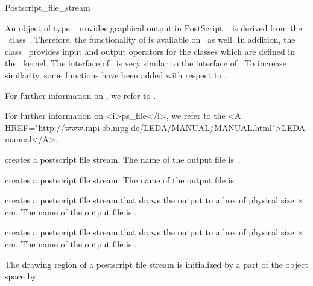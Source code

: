 
\begin{ccRefClass} {Postscript_file_stream}



\ccDefinition 
An object of type \ccRefName\ provides graphical output in PostScript.
\ccRefName\ is derived from the \leda\ class .
Therefore, the functionality of  is available on \ccRefName\ as well.
In addition, the class \ccRefName\ provides input and output 
operators for the classes which are defined in the \cgal\ kernel.
The interface of \ccRefName\ is very similar to the interface of . 
To increase similarity, some functions have been added with respect to .
\begin{ccTexOnly}
For further information on , we refer to \cite{cgal:mnsu-lum}.
\end{ccTexOnly}
\begin{ccHtmlOnly}
For further information on <i>ps_file</i>, we refer to the 
<A HREF="http://www.mpi-sb.mpg.de/LEDA/MANUAL/MANUAL.html">LEDA manual</A>.
\end{ccHtmlOnly}


\ccCreation

{creates a postscript file stream. The name of the output file is
 .}

{creates a postscript file stream. The name of the output file is
 .}

{creates a postscript file stream that draws the output to a box
of physical size  $\times$  cm.
The name of the output file is  .}

{creates a postscript file stream that draws the output to a box
of physical size  $\times$  cm.
The name of the output file is  .}


\ccOperations
The drawing region of a postscript file stream is initialized by a part of the 
object space by


\end{ccRefClass}
